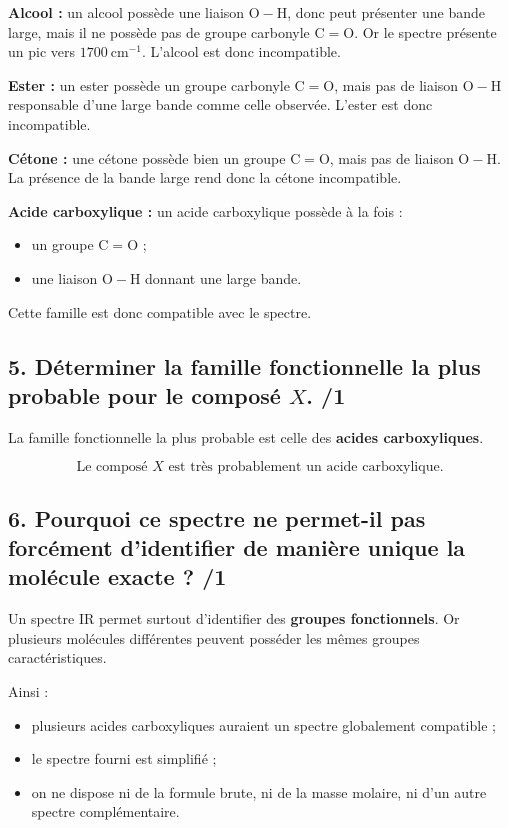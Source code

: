 \documentclass[11pt,a4paper]{article}
\begin{document}
\textbf{Alcool :} un alcool possède une liaison \(\mathrm{O-H}\), donc peut présenter une bande large, mais il ne possède pas de groupe carbonyle \(\mathrm{C=O}\). Or le spectre présente un pic vers \(1700\ \mathrm{cm}^{-1}\). L'alcool est donc incompatible.

\textbf{Ester :} un ester possède un groupe carbonyle \(\mathrm{C=O}\), mais pas de liaison \(\mathrm{O-H}\) responsable d'une large bande comme celle observée. L'ester est donc incompatible.

\textbf{Cétone :} une cétone possède bien un groupe \(\mathrm{C=O}\), mais pas de liaison \(\mathrm{O-H}\). La présence de la bande large rend donc la cétone incompatible.

\textbf{Acide carboxylique :} un acide carboxylique possède à la fois :
\begin{itemize}
    \item un groupe \(\mathrm{C=O}\) ;
    \item une liaison \(\mathrm{O-H}\) donnant une large bande.
\end{itemize}
Cette famille est donc compatible avec le spectre.

\subsection*{5. Déterminer la famille fonctionnelle la plus probable pour le composé \(X\). \hfill /1}

La famille fonctionnelle la plus probable est celle des \textbf{acides carboxyliques}.

\[
\boxed{\text{Le composé }X\text{ est très probablement un acide carboxylique.}}
\]

\subsection*{6. Pourquoi ce spectre ne permet-il pas forcément d'identifier de manière unique la molécule exacte ? \hfill /1}

Un spectre IR permet surtout d'identifier des \textbf{groupes fonctionnels}. Or plusieurs molécules différentes peuvent posséder les mêmes groupes caractéristiques.

Ainsi :
\begin{itemize}
    \item plusieurs acides carboxyliques auraient un spectre globalement compatible ;
    \item le spectre fourni est simplifié ;
    \item on ne dispose ni de la formule brute, ni de la masse molaire, ni d'un autre spectre complémentaire.
\end{itemize}
\end{document}
